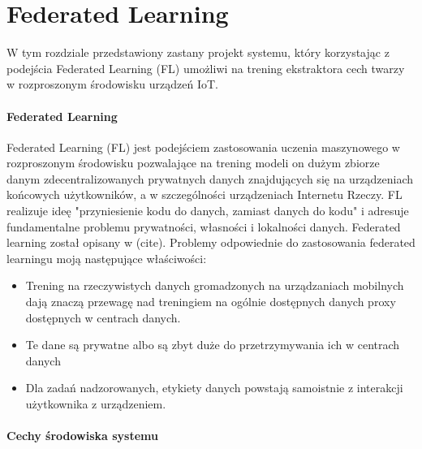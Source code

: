 \newpage
\section[federated]{Federated Learning}

W tym rozdziale przedstawiony zastany projekt systemu, który korzystając z podejścia Federated  Learning (FL) umożliwi na trening ekstraktora cech twarzy w rozproszonym środowisku urządzeń IoT.


\paragraph{Federated Learning}

Federated Learning (FL) jest podejściem zastosowania uczenia maszynowego w rozproszonym
środowisku pozwalające na trening modeli on dużym zbiorze danym zdecentralizowanych prywatnych
danych znajdujących się na urządzeniach końcowych użytkowników, a w szczególności urządzeniach
Internetu Rzeczy. FL realizuje ideę "przyniesienie kodu do danych, zamiast danych do kodu" i
adresuje fundamentalne problemu prywatności, własności i lokalności danych. Federated learning
został opisany w (cite).
Problemy odpowiednie do zastosowania federated learningu moją następujące właściwości:
\begin{itemize}
\item Trening na rzeczywistych danych gromadzonych na urządzaniach mobilnych dają znaczą przewagę
nad treningiem na ogólnie dostępnych danych proxy dostępnych w centrach danych.
\item Te dane są prywatne albo są zbyt duże do przetrzymywania ich w centrach danych
\item Dla zadań nadzorowanych, etykiety danych powstają samoistnie z interakcji użytkownika z urządzeniem.
\end{itemize}

\paragraph{Cechy środowiska systemu}

